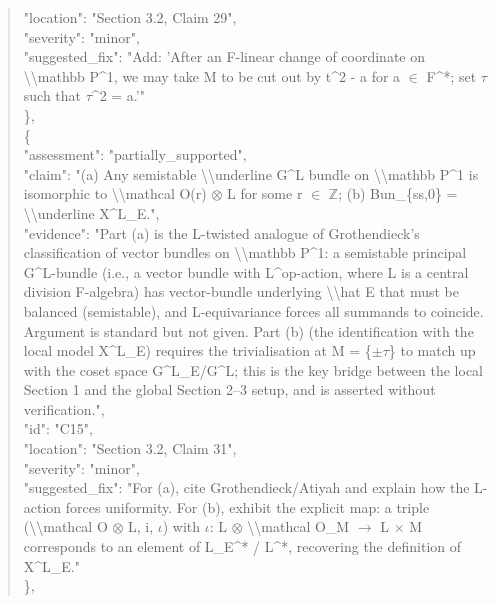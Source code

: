\documentclass[11pt]{article}
\begin{document}
\begin{quote}
      "location": "Section 3.2, Claim 29",\\
      "severity": "minor",\\
      "suggested\_fix": "Add: 'After an F-linear change of coordinate on \textbackslash{}\textbackslash{}mathbb P\^{}1, we may take M to be cut out by t\^{}2 - a for a \ensuremath{\in} F\^{}*; set \ensuremath{\tau} such that \ensuremath{\tau}\^{}2 = a.'"\\
    \},\\
    \{\\
      "assessment": "partially\_supported",\\
      "claim": "(a) Any semistable \textbackslash{}\textbackslash{}underline G\^{}L bundle on \textbackslash{}\textbackslash{}mathbb P\^{}1 is isomorphic to \textbackslash{}\textbackslash{}mathcal O(r) \ensuremath{\otimes} L for some r \ensuremath{\in} \ensuremath{\mathbb{Z}}; (b) Bun\_\{ss,0\} = \textbackslash{}\textbackslash{}underline X\^{}L\_E.",\\
      "evidence": "Part (a) is the L-twisted analogue of Grothendieck's classification of vector bundles on \textbackslash{}\textbackslash{}mathbb P\^{}1: a semistable principal G\^{}L-bundle (i.e., a vector bundle with L\^{}op-action, where L is a central division F-algebra) has vector-bundle underlying \textbackslash{}\textbackslash{}hat E that must be balanced (semistable), and L-equivariance forces all summands to coincide. Argument is standard but not given. Part (b) (the identification with the local model X\^{}L\_E) requires the trivialisation at M = \{\ensuremath{\pm}\ensuremath{\tau}\} to match up with the coset space G\^{}L\_E/G\^{}L; this is the key bridge between the local Section 1 and the global Section 2--3 setup, and is asserted without verification.",\\
      "id": "C15",\\
      "location": "Section 3.2, Claim 31",\\
      "severity": "minor",\\
      "suggested\_fix": "For (a), cite Grothendieck/Atiyah and explain how the L-action forces uniformity. For (b), exhibit the explicit map: a triple (\textbackslash{}\textbackslash{}mathcal O \ensuremath{\otimes} L, i, \ensuremath{\iota}) with \ensuremath{\iota}: L \ensuremath{\otimes} \textbackslash{}\textbackslash{}mathcal O\_M \ensuremath{\to} L \ensuremath{\times} M corresponds to an element of L\_E\^{}* / L\^{}*, recovering the definition of X\^{}L\_E."\\
    \},\\

\end{quote}
\end{document}
